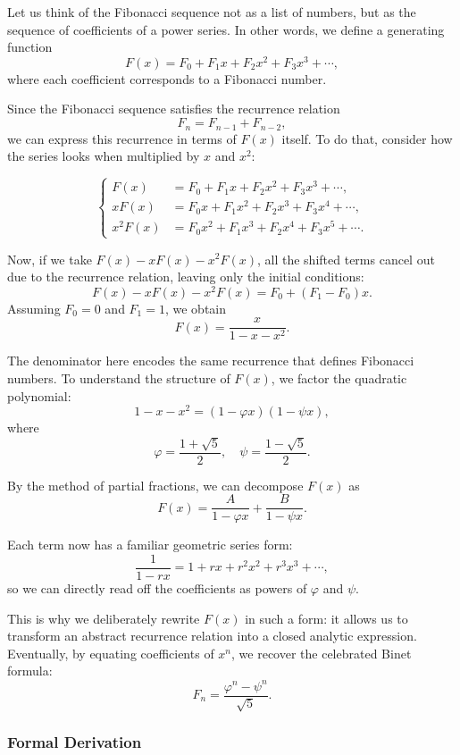 \documentclass{article}
\begin{document}
Let us think of the Fibonacci sequence not as a list of numbers, but as the sequence of coefficients of a power series.  
In other words, we define a generating function
\[
F(x) = F_0 + F_1x + F_2x^2 + F_3x^3 + \cdots,
\]
where each coefficient corresponds to a Fibonacci number.  

Since the Fibonacci sequence satisfies the recurrence relation
\[
F_n = F_{n-1} + F_{n-2},
\]
we can express this recurrence in terms of $F(x)$ itself.  
To do that, consider how the series looks when multiplied by $x$ and $x^2$:

\[
\left\{
\begin{aligned}
	F(x) &= F_0 + F_1x + F_2x^2 + F_3x^3 + \cdots, \\
	xF(x) &= F_0x + F_1x^2 + F_2x^3 + F_3x^4 + \cdots, \\
	x^2F(x) &= F_0x^2 + F_1x^3 + F_2x^4 + F_3x^5 + \cdots.
\end{aligned}
\right.
\]

Now, if we take $F(x) - xF(x) - x^2F(x)$, all the shifted terms cancel out due to the recurrence relation, leaving only the initial conditions:
\[
F(x) - xF(x) - x^2F(x) = F_0 + (F_1 - F_0)x.
\]
Assuming $F_0 = 0$ and $F_1 = 1$, we obtain
\[
F(x) = \frac{x}{1 - x - x^2}.
\]

The denominator here encodes the same recurrence that defines Fibonacci numbers.  
To understand the structure of $F(x)$, we factor the quadratic polynomial:
\[
1 - x - x^2 = (1 - \varphi x)(1 - \psi x),
\]
where 
\[
\varphi = \frac{1 + \sqrt{5}}{2}, \quad \psi = \frac{1 - \sqrt{5}}{2}.
\]

By the method of partial fractions, we can decompose $F(x)$ as
\[
F(x) = \frac{A}{1 - \varphi x} + \frac{B}{1 - \psi x}.
\]

Each term now has a familiar geometric series form:
\[
\frac{1}{1 - r x} = 1 + r x + r^2x^2 + r^3x^3 + \cdots,
\]
so we can directly read off the coefficients as powers of $\varphi$ and $\psi$.  

This is why we deliberately rewrite $F(x)$ in such a form:  
it allows us to transform an abstract recurrence relation into a closed analytic expression.  
Eventually, by equating coefficients of $x^n$, we recover the celebrated Binet formula:
\[
F_n = \frac{\varphi^n - \psi^n}{\sqrt{5}}.
\]

\subsubsection{Formal Derivation}
\end{document}
